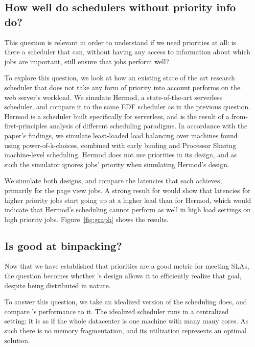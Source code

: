 \subsection{How well do schedulers without priority info do?}

This question is relevant in order to understand if we need priorities at all:
is there a scheduler that can, without having any access to information about
which jobs are important, still ensure that jobs perform well?

To explore this question, we look at how an existing state of the art research
scheduler that does not take any form of priority into account performs on the
web server's workload. We simulate Hermod\cite{TODO}, a state-of-the-art
serverless scheduler, and compare it to the same EDF scheduler as in the
previous question. Hermod is a scheduler built specifically for serverless, and
is the result of a from-first-principles analysis of different scheduling
paradigms. In accordance with the paper's findings, we simulate least-loaded
load balancing over machines found using power-of-k-choices, combined with early
binding and Processor Sharing machine-level scheduling. Hermod does not use
priorities in its design, and as such the simulator ignores jobs' priority when
simulating Hermod's design.

We simulate both designs, and compare the latencies that each achieves,
primarily for the page view jobs. A strong result for \sys{} would show that
latencies for higher priority jobs start going up at a higher load than for
Hermod, which would indicate that Hermod's scheduling cannot perform as well in
high load settings on high priority jobs. Figure~\ref{fig:graph} shows the
results.


\subsection{Is \sys{} good at binpacking?}

Now that we have established that priorities are a good metric for meeting SLAs,
the question becomes whether \sys{}'s design allows it to efficiently realize
that goal, despite being distributed in nature.

To answer this question, we take an idealized version of the scheduling \sys{}
does, and compare \sys{}'s performance to it. The idealized scheduler runs in a
centralized setting: it is as if the whole datacenter is one machine with many
many cores. As such there is no memory fragmentation, and its utilization
represents an optimal solution.

